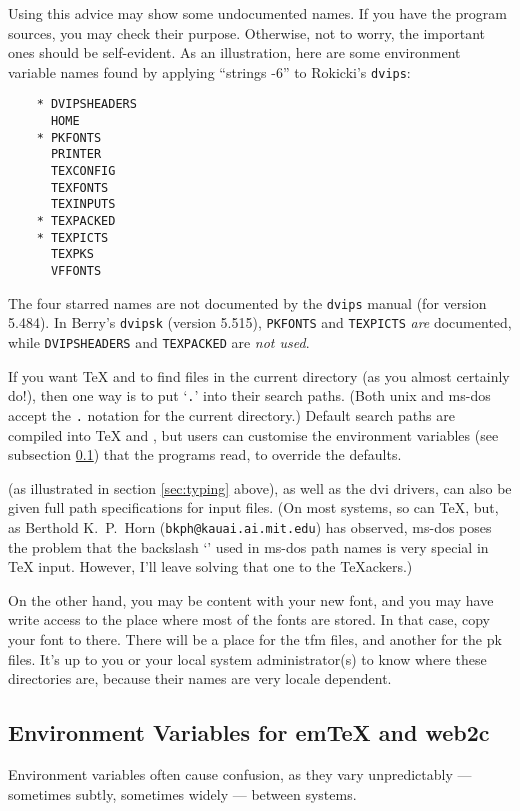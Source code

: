Using this advice may show some undocumented names.
If you have the program sources, you may check their purpose.
Otherwise, not to worry, the important ones should be self-evident.
As an illustration, here are some environment variable names found by
applying ``strings -6'' to {\sc Rokicki's} {\tt dvips}:
\begin{verbatim}
    * DVIPSHEADERS
      HOME
    * PKFONTS
      PRINTER
      TEXCONFIG
      TEXFONTS
      TEXINPUTS
    * TEXPACKED
    * TEXPICTS
      TEXPKS
      VFFONTS
\end{verbatim}
The four starred names are not documented by the {\tt dvips} manual
(for version 5.484).
In {\sc Berry's} {\tt dvipsk} (version 5.515),
{\tt PKFONTS} and {\tt TEXPICTS} {\em are} documented,
while {\tt DVIPSHEADERS} and {\tt TEXPACKED} are {\em not used}.

If you want \TeX{} and \MF{} to find files in the current directory
(as you almost certainly do!), then one way is to put `{\tt .}' into
their search paths.
(Both {\sc unix} and {\sc ms-dos} accept the {\tt .} notation
for the current directory.)
Default search paths are compiled into \TeX{} and \MF{}, but users
can customise the environment variables (see subsection \ref{sub:env})
that the programs read, to override the defaults.

\MF{} (as illustrated in section \ref{sec:typing} above),
as well as the {\sc dvi} drivers,
can also be given full path specifications for input files.
(On most systems, so can \TeX{}, but, as Berthold K.~P.~{\sc Horn}
({\tt bkph@kauai.ai.mit.edu}) has observed,
{\sc ms-dos} poses the problem that the backslash `\ttbsl{}'
used in {\sc ms-dos} path names is very special in \TeX{} input.
However, I'll leave solving that one to the \TeX{}ackers.)

On the other hand, you may be content with your new font, and you may
have write access to the place where most of the fonts are stored.  In
that case, copy your font to there.  There will be a place for the
{\sc tfm} files, and another for the {\sc pk} files.  It's up to you
or your local system administrator(s) to know where these directories
are, because their names are very locale dependent.


\subsection{Environment Variables for em\TeX{} and {\sf web2c}}%
\label{sub:env}

Environment variables often cause confusion, as they vary unpredictably
--- sometimes subtly, sometimes widely --- between systems.

